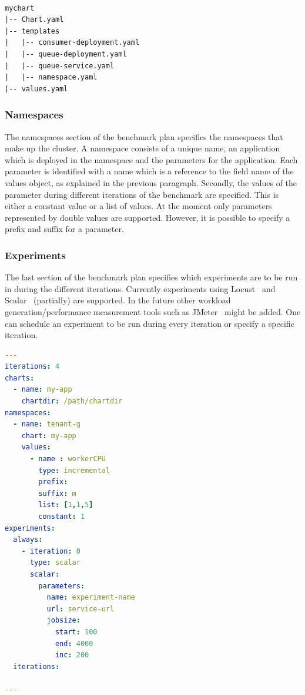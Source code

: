 \begin{lstlisting}[caption=Directory structure of simple batch processing application helm chart., label={lst:helmcart}]

mychart
|-- Chart.yaml
|-- templates
|   |-- consumer-deployment.yaml
|   |-- queue-deployment.yaml
|   |-- queue-service.yaml
|   |-- namespace.yaml
|-- values.yaml

\end{lstlisting}



\subsubsection{Namespaces}
The namespaces section of the benchmark plan specifies the namespaces that make up the cluster. A namespace consists  of a unique name, an application which is deployed in the namespace and the parameters for the application. Each parameter is identified with a name which is a reference to the field name of the values object, as explained in the previous paragraph. Secondly, the values of the parameter  during different iterations of the benchmark are specified. This is either a constant value or a list of values. At the moment only parameters represented by double values are supported.  However, it is possible to specify a prefix and suffix for a parameter. 

\subsubsection{Experiments}
The last section of the benchmark plan specifies which experiments are to be run in during the different iterations. Currently  experiments using Locust~\cite{locust} and Scalar~\cite{heyman2014scalability} (partially) are supported. In the future other workload generation/performance measurement tools such as JMeter~\cite{jmeter} might be added. One can schedule an experiment to be run during every iteration or specify a specific iteration.

\begin{lstlisting}[caption=Benchmark plan configuration file., language=yaml, label={lst:benchconfig}]
---
iterations: 4
charts:
  - name: my-app
    chartdir: /path/chartdir
namespaces:
  - name: tenant-g
    chart: my-app
    values:
      - name : workerCPU 
        type: incremental
        prefix: 
        suffix: m
        list: [1,1,5]
        constant: 1
experiments:
  always:
    - iteration: 0
      type: scalar
      scalar: 
        parameters:
          name: experiment-name
          url: service-url
          jobsize:
            start: 100
            end: 4000
            inc: 200
  iterations:

---
\end{lstlisting}
